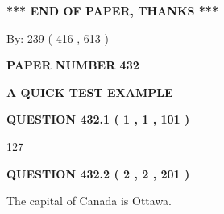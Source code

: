 \documentclass[12pt]{article}
\begin{document}
 
 
 
   
   
 \vspace{0.2in}
 
   
   
   
   
\vspace{1.0in} 
{\textbf{\large{ *** END OF PAPER, THANKS *** }}} 
   
   
\hspace{1.0in} By: 
 239 ( 416 ,  613 )
   
   
   
   
\newpage 
\setcounter{page}{ 
   432001 } 
   
   
   
   
 {\textbf{ \Large{ PAPER NUMBER  432  }}}
   
   
\vspace{0.2in}
   
   
   
   
   
   
 \vspace{0.2in}
{\LARGE {\textbf{ A QUICK TEST EXAMPLE}}}
   
   
  
\vspace{0.2in}
  
{\textbf{\Large{QUESTION
432.1 
 ( 1 , 1 , 101 )
}}}
  
  
 
 
\noindent{}

127
 
 
  
\vspace{0.2in}
  
{\textbf{\Large{QUESTION
432.2 
 ( 2 , 2 , 201 )
}}}
  
  
 
 
\noindent{}
 
 
The capital of Canada is Ottawa.
 
 
 
 
   
   
 \vspace{0.2in}
 
   
   
   
   
\end{document}
